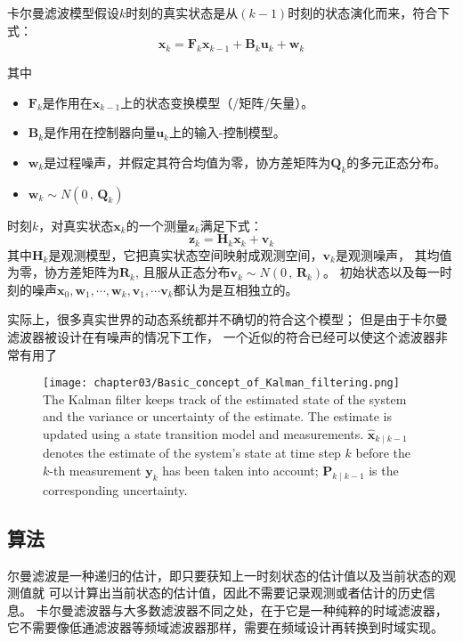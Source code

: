 卡尔曼滤波模型假设$k$时刻的真实状态是从$(k-1)$时刻的状态演化而来，符合下式：
\begin{equation}
  \bm{x}_k=\bm{F}_k \bm{x}_{k-1} + \bm{B}_k \bm{u}_{k} + \bm{w}_k
\end{equation}

其中
\begin{itemize}
  \item $\bm{F}_k$是作用在$\bm{x}_{k-1}$上的状态变换模型（/矩阵/矢量）。
  \item $\bm{B}_k$是作用在控制器向量$\bm{u}_k$上的输入-控制模型。
  \item $\bm{w}_k$是过程噪声，并假定其符合均值为零，协方差矩阵为$\bm{Q}_k$的多元正态分布。
  \item $\bm{w}_{k} \sim N(0 \, , \, \bm{Q}_k)$
\end{itemize}

时刻$k$，对真实状态$\bm{x}_k$的一个测量$\bm{z}_k$满足下式：
\begin{equation}
  \bm{z}_k=\bm{H}_k \bm{x}_k + \bm{v}_k
\end{equation}
其中$\bm{H}_k$是观测模型，它把真实状态空间映射成观测空间，$\bm{v}_k$是观测噪声，
其均值为零，协方差矩阵为$\bm{R}_k$,
且服从正态分布$\bm{v}_{k} \sim N(0 \, , \, \bm{R}_k)$。
初始状态以及每一时刻的噪声${\bm{x}_0, \bm{w}_1, \cdots ,
\bm{w}_k, \bm{v}_1, \cdots \bm{v}_k}$都认为是互相独立的。

实际上，很多真实世界的动态系统都并不确切的符合这个模型；
但是由于卡尔曼滤波器被设计在有噪声的情况下工作，
一个近似的符合已经可以使这个滤波器非常有用了
\begin{figure}[!htp]
  \centering
  \texttt{[image: chapter03/Basic\_concept\_of\_Kalman\_filtering.png]}
    {The Kalman filter keeps track of the estimated state of the system 
    and the variance or uncertainty of the estimate. 
    The estimate is updated using a state transition model and measurements. 
    $\hat{\bm{x}}_{k \mid k-1}$ denotes the estimate of the system's state 
    at time step $k$ before the $k$-th measurement $\bm{y}_k$ has been 
    taken into account;
    $\bm{P}_{k\mid k-1}$ is the corresponding uncertainty.}
  \label{fig:Basic_concept_of_Kalman_filtering}
\end{figure}

\subsection{算法}
尔曼滤波是一种递归的估计，即只要获知上一时刻状态的估计值以及当前状态的观测值就
可以计算出当前状态的估计值，因此不需要记录观测或者估计的历史信息。
卡尔曼滤波器与大多数滤波器不同之处，在于它是一种纯粹的时域滤波器，
它不需要像低通滤波器等频域滤波器那样，需要在频域设计再转换到时域实现。

